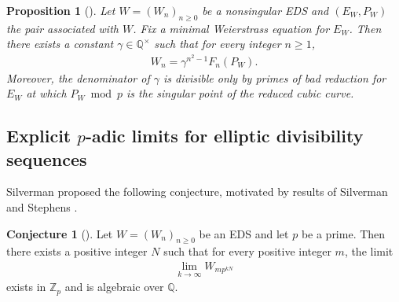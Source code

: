 \documentclass[11pt]{amsart}
\newtheorem{prop}[thm]{Proposition}
\theoremstyle{definition}
\newtheorem{conj}[thm]{Conjecture}
\begin{document}


\begin{prop}[{\cite[Proposition 18]{Si05a}}]\label{prop18}
Let $W=(W_n)_{n \geq 0}$ be a nonsingular EDS and $(E_W, P_W)$ the pair associated with $W$. Fix a minimal Weierstrass equation for $E_W$. Then there exists a constant $\gamma \in \mathbb{Q}^{\times}$ such that for every integer $n \geq 1$,
%
\begin{align*}
W_n=\gamma^{n^2-1}F_n(P_W).
\end{align*}
%
Moreover, the denominator of $\gamma$ is divisible only by primes of bad reduction for $E_W$ at which $P_W \bmod p$ is the singular point of the reduced cubic curve.
\end{prop}


\subsection{Explicit $p$-adic limits for elliptic divisibility sequences}

Silverman proposed the following conjecture, motivated by results of Silverman and Stephens \cite{SS06}.

\begin{conj}[{\cite[Conjecture 19]{Si05a}}]\label{silverman conj}
Let $W=(W_n)_{n \geq 0}$ be an EDS and let $p$ be a prime. Then there exists a positive integer $N$ such that for every positive integer $m$, the limit 
%
\begin{align}\label{lim W}
\lim_{k \to \infty} W_{mp^{kN}}
\end{align}
%
exists in $\mathbb{Z}_p$ and is algebraic over $\mathbb{Q}$.
\end{conj}
\end{document}
